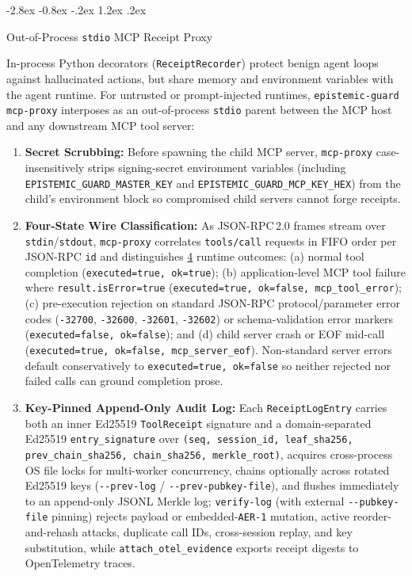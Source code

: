 \documentclass[10pt,twocolumn]{article}
\makeatletter
\renewcommand\subsection{\@startsection{subsection}{2}{\z@}%
  {-2.8ex \@plus -0.8ex \@minus -.2ex}%
  {1.2ex \@plus .2ex}%
  {\normalfont\large\bfseries\raggedright}}
\makeatother
\begin{document}
\subsection{Out-of-Process \texttt{stdio} MCP Receipt Proxy}
\label{sec:proxy}

In-process Python decorators (\texttt{Receipt\allowbreak Recorder}) protect benign agent loops against hallucinated actions, but share memory and environment variables with the agent runtime. For untrusted or prompt-injected runtimes, \texttt{epistemic-guard mcp-proxy} interposes as an out-of-process \texttt{stdio} parent between the MCP host and any downstream MCP tool server:
\begin{enumerate}
  \item \textbf{Secret Scrubbing:} Before spawning the child MCP server, \texttt{mcp-proxy} case-insensitively strips signing-secret environment variables (including \texttt{EPISTEMIC\_\allowbreak GUARD\_\allowbreak MASTER\_\allowbreak KEY} and \texttt{EPISTEMIC\_\allowbreak GUARD\_\allowbreak MCP\_\allowbreak KEY\_\allowbreak HEX}) from the child's environment block so compromised child servers cannot forge receipts.
  \item \textbf{Four-State Wire Classification:} As JSON-RPC\,2.0 frames stream over \texttt{stdin}/\texttt{stdout}, \texttt{mcp-proxy} correlates \texttt{tools/call} requests in FIFO order per JSON-RPC \texttt{id} and distinguishes \href{https://github.com/AlienatedAliens/epistemic-guard/blob/v0.5.2/results/table2_conformance.json\#L31}{4} runtime outcomes: (a) normal tool completion (\texttt{executed=true, ok=true}); (b) application-level MCP tool failure where \texttt{result.isError=true} (\texttt{executed=true, ok=false, mcp\_\allowbreak tool\_\allowbreak error}); (c) pre-execution rejection on standard JSON-RPC protocol/parameter error codes (\texttt{-32700}, \texttt{-32600}, \texttt{-32601}, \texttt{-32602}) or schema-validation error markers (\texttt{executed=false, ok=false}); and (d) child server crash or EOF mid-call (\texttt{executed=true, ok=false, mcp\_\allowbreak server\_\allowbreak eof}). Non-standard server errors default conservatively to \texttt{executed=true, ok=false} so neither rejected nor failed calls can ground completion prose.
  \item \textbf{Key-Pinned Append-Only Audit Log:} Each \texttt{Receipt\allowbreak Log\allowbreak Entry} carries both an inner Ed25519 \texttt{Tool\allowbreak Receipt} signature and a domain-separated Ed25519 \texttt{entry\_\allowbreak signature} over \texttt{(seq, session\_\allowbreak id, leaf\_\allowbreak sha256, prev\_\allowbreak chain\_\allowbreak sha256, chain\_\allowbreak sha256, merkle\_\allowbreak root)}, acquires cross-process OS file locks for multi-worker concurrency, chains optionally across rotated Ed25519 keys (\texttt{-{-}prev-log} / \texttt{-{-}prev-pubkey-file}), and flushes immediately to an append-only JSONL Merkle log; \texttt{verify-log} (with external \texttt{-{-}pubkey-file} pinning) rejects payload or embedded-\texttt{AER-1} mutation, active reorder-and-rehash attacks, duplicate call IDs, cross-session replay, and key substitution, while \texttt{attach\_\allowbreak otel\_\allowbreak evidence} exports receipt digests to OpenTelemetry traces.
\end{enumerate}
\end{document}
